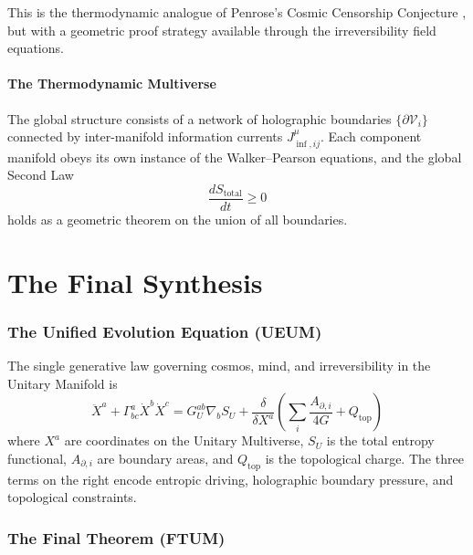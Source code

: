 \documentclass[12pt,a4paper]{article}
\begin{document}
This is the thermodynamic analogue of Penrose's Cosmic Censorship
Conjecture \citep{Penrose1969}, but with a geometric proof strategy available
through the irreversibility field equations.

\subsection{The Thermodynamic Multiverse}

The global structure consists of a network of holographic boundaries
$\{\partial\mathcal{V}_i\}$ connected by inter-manifold information currents
$J_{\inf,ij}^\mu$.  Each component manifold obeys its own instance of the
Walker--Pearson equations, and the global Second Law
\begin{equation}
  \frac{dS_{\text{total}}}{dt} \ge 0
  \label{eq:global-2nd-law}
\end{equation}
holds as a geometric theorem on the union of all boundaries.

\part{The Final Synthesis}

\section{The Unified Evolution Equation (UEUM)}
\label{sec:UEUM}

The single generative law governing cosmos, mind, and irreversibility in the
Unitary Manifold is
\begin{equation}
  \boxed{
  \ddot{X}^a
  + \Gamma^a_{bc}\dot{X}^b\dot{X}^c
  = G_U^{ab}\nabla_b S_U
    + \frac{\delta}{\delta X^a}\!\left(
        \sum_i \frac{A_{\partial,i}}{4G}
        + Q_{\text{top}}
      \right)
  }
  \label{eq:UEUM}
\end{equation}
where $X^a$ are coordinates on the Unitary Multiverse, $S_U$ is the total
entropy functional, $A_{\partial,i}$ are boundary areas, and $Q_{\text{top}}$
is the topological charge.  The three terms on the right encode entropic
driving, holographic boundary pressure, and topological constraints.

\section{The Final Theorem (FTUM)}
\label{sec:FTUM}
\end{document}
